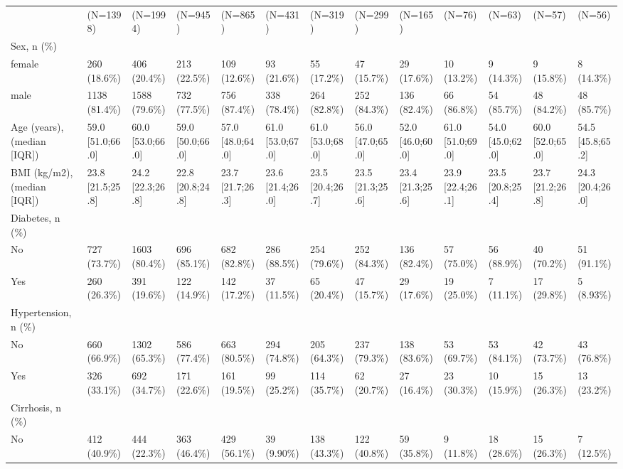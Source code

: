 \begin{landscape}
\begin{center}
\begin{longtable}{p{5.2cm}p{3.0cm}}
     & (N=1398) & (N=1994) & (N=945) & (N=865) & (N=431) & (N=319) & (N=299) & (N=165) & (N=76) & (N=63) & (N=57) & (N=56) \\
Sex, n (\%) &  &  &  &  &  &  &  &  &  &  &  &  \\
female & 260 (18.6\%) & 406 (20.4\%) & 213 (22.5\%) & 109 (12.6\%) & 93 (21.6\%) & 55 (17.2\%) & 47 (15.7\%) & 29 (17.6\%) & 10 (13.2\%) & 9 (14.3\%) & 9 (15.8\%) & 8 (14.3\%) \\
male & 1138 (81.4\%) & 1588 (79.6\%) & 732 (77.5\%) & 756 (87.4\%) & 338 (78.4\%) & 264 (82.8\%) & 252 (84.3\%) & 136 (82.4\%) & 66 (86.8\%) & 54 (85.7\%) & 48 (84.2\%) & 48 (85.7\%) \\
Age (years), (median [IQR]) & 59.0 [51.0;66.0] & 60.0 [53.0;66.0] & 59.0 [50.0;66.0] & 57.0 [48.0;64.0] & 61.0 [53.0;67.0] & 61.0 [53.0;68.0] & 56.0 [47.0;65.0] & 52.0 [46.0;60.0] & 61.0 [51.0;69.0] & 54.0 [45.0;62.0] & 60.0 [52.0;65.0] & 54.5 [45.8;65.2] \\
BMI (kg/m2), (median [IQR]) & 23.8 [21.5;25.8] & 24.2 [22.3;26.8] & 22.8 [20.8;24.8] & 23.7 [21.7;26.3] & 23.6 [21.4;26.0] & 23.5 [20.4;26.7] & 23.5 [21.3;25.6] & 23.4 [21.3;25.6] & 23.9 [22.4;26.1] & 23.5 [20.8;25.4] & 23.7 [21.2;26.8] & 24.3 [20.4;26.0] \\
Diabetes, n (\%) &  &  &  &  &  &  &  &  &  &  &  &  \\
No & 727 (73.7\%) & 1603 (80.4\%) & 696 (85.1\%) & 682 (82.8\%) & 286 (88.5\%) & 254 (79.6\%) & 252 (84.3\%) & 136 (82.4\%) & 57 (75.0\%) & 56 (88.9\%) & 40 (70.2\%) & 51 (91.1\%) \\
Yes & 260 (26.3\%) & 391 (19.6\%) & 122 (14.9\%) & 142 (17.2\%) & 37 (11.5\%) & 65 (20.4\%) & 47 (15.7\%) & 29 (17.6\%) & 19 (25.0\%) & 7 (11.1\%) & 17 (29.8\%) & 5 (8.93\%) \\
Hypertension, n (\%) &  &  &  &  &  &  &  &  &  &  &  &  \\
No & 660 (66.9\%) & 1302 (65.3\%) & 586 (77.4\%) & 663 (80.5\%) & 294 (74.8\%) & 205 (64.3\%) & 237 (79.3\%) & 138 (83.6\%) & 53 (69.7\%) & 53 (84.1\%) & 42 (73.7\%) & 43 (76.8\%) \\
Yes & 326 (33.1\%) & 692 (34.7\%) & 171 (22.6\%) & 161 (19.5\%) & 99 (25.2\%) & 114 (35.7\%) & 62 (20.7\%) & 27 (16.4\%) & 23 (30.3\%) & 10 (15.9\%) & 15 (26.3\%) & 13 (23.2\%) \\
Cirrhosis, n (\%) &  &  &  &  &  &  &  &  &  &  &  &  \\
No & 412 (40.9\%) & 444 (22.3\%) & 363 (46.4\%) & 429 (56.1\%) & 39 (9.90\%) & 138 (43.3\%) & 122 (40.8\%) & 59 (35.8\%) & 9 (11.8\%) & 18 (28.6\%) & 15 (26.3\%) & 7 (12.5\%) \\

\end{longtable}
\end{center}
\end{landscape}
